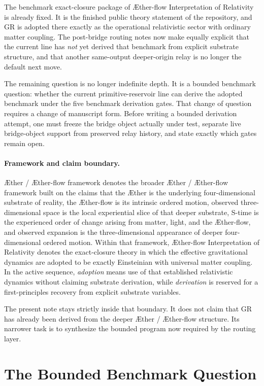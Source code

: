 \documentclass[11pt]{article}
\newcommand{\Aether}{\AE{}ther}
\newcommand{\Aflow}{\AE{}ther-flow}
\newcommand{\TheoryName}{\Aflow{} Interpretation of Relativity}
\newcommand{\TheoryProgram}{\Aether{} / \Aflow{} framework}
\begin{document}
The benchmark exact-closure package of \TheoryName{} is already fixed. It is the finished public theory statement of the repository, and GR is adopted there exactly as the operational relativistic sector with ordinary matter coupling. The post-bridge routing notes now make equally explicit that the current line has \emph{not} yet derived that benchmark from explicit substrate structure, and that another same-output deeper-origin relay is no longer the default next move.

The remaining question is no longer indefinite depth. It is a bounded benchmark question: whether the current primitive-reservoir line can derive the adopted benchmark under the five benchmark derivation gates. That change of question requires a change of manuscript form. Before writing a bounded derivation attempt, one must freeze the bridge object actually under test, separate live bridge-object support from preserved relay history, and state exactly which gates remain open.

\paragraph{Framework and claim boundary.}
\TheoryProgram{} denotes the broader \Aether{} / \Aflow{} framework built on the claims that the \Aether{} is the underlying four-dimensional substrate of reality, the \Aflow{} is its intrinsic ordered motion, observed three-dimensional space is the local experiential slice of that deeper substrate, S-time is the experienced order of change arising from matter, light, and the \Aflow{}, and observed expansion is the three-dimensional appearance of deeper four-dimensional ordered motion. Within that framework, \TheoryName{} denotes the exact-closure theory in which the effective gravitational dynamics are adopted to be exactly Einsteinian with universal matter coupling. In the active sequence, \emph{adoption} means use of that established relativistic dynamics without claiming substrate derivation, while \emph{derivation} is reserved for a first-principles recovery from explicit substrate variables.

The present note stays strictly inside that boundary. It does not claim that GR has already been derived from the deeper \Aether{} / \Aflow{} structure. Its narrower task is to synthesize the bounded program now required by the routing layer.

\section{The Bounded Benchmark Question}
\end{document}
